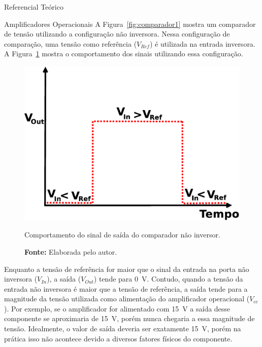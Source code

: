 \begin{chapter}{Referencial Teórico}
\begin{section}{Amplificadores Operacionais}
A Figura~\ref{fig:comparador1} mostra um comparador de tensão utilizando a
configuração não inversora. Nessa configuração de comparação, uma tensão como
referência ($V_{Ref}$) é utilizada na entrada inversora. A
Figura~\ref{fig:sinal1} mostra o comportamento dos sinais utilizando essa
configuração.

\begin{figure}[!h]
	\centering
	\begin{minipage}[c]{\textwidth}
	\centering
	\includegraphics[width=0.55\linewidth]{fig/comparador_nao_inversor}
	\caption{Comportamento do sinal de saída do comparador não inversor.}
	\vspace{-1cm}
	\caption*{\textbf{Fonte: }Elaborada pelo autor.}
	\label{fig:sinal1}
	\end{minipage}
\end{figure}

Enquanto a tensão de referência for maior que o sinal da entrada na porta não
inversora ($V_{In}$), a saída ($V_{Out}$) tende para 0~V. Contudo, quando a
tensão da entrada não inversora é maior que a tensão de referência, a saída
tende para a magnitude da tensão utilizada como alimentação do amplificador
operacional ($V_{cc}$). Por exemplo, se o amplificador for alimentado com 15~V a
saída desse componente se aproximaria de 15~V, porém nunca chegaria a essa
magnitude de tensão. Idealmente, o valor de saída deveria ser exatamente 15~V,
porém na prática isso não acontece devido a diversos fatores físicos do
componente.


\end{section}
\end{chapter}
